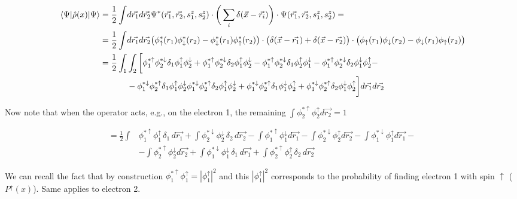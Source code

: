 	\begin{align*}
		\mel{\Psi}{\hat{\rho}(x)}{\Psi}=\frac{1}{2}\int &d\vec{r_1}d\vec{r_2} \Psi^*(\vec{r_1},\vec{r_2},s_1^z,s_2^z)\cdot\bigg(\sum_i \delta(\vec{x}-\vec{r_i})\bigg)\cdot\Psi(\vec{r_1},\vec{r_2},s_1^z,s_2^z)=\\
		=\frac{1}{2}\int &d\vec{r_1}d\vec{r_2}\big(\phi^*_\uparrow(r_1)\phi^*_\downarrow(r_2)-\phi^*_\downarrow(r_1)\phi^*_\uparrow(r_2)\big)\cdot\big(\delta(\vec{x}-\vec{r_1})+\delta(\vec{x}-\vec{r_2})\big)\cdot\big(\phi_\uparrow(r_1)\phi_\downarrow(r_2)-\phi_\downarrow(r_1)\phi_\uparrow(r_2)\big)\\
		=\frac{1}{2}\int_1&\int_2\bigg[\phi_1^{*\uparrow}\phi_2^{*\downarrow}\delta_1\phi_1^\uparrow\phi_2^\downarrow+\phi_1^{*\uparrow}\phi_2^{*\downarrow}\delta_2\phi_1^\uparrow\phi_2^\downarrow-\phi_1^{*\uparrow}\phi_2^{*\downarrow}\delta_1\phi_2^\uparrow\phi_1^\downarrow-\phi_1^{*\uparrow}\phi_2^{*\downarrow}\delta_2\phi_1^\downarrow\phi_2^\uparrow-\\
											&-\phi_1^{*\downarrow}\phi_2^{*\uparrow}\delta_1\phi_1^\uparrow\phi_2^\downarrow\phi_1^{*\downarrow}\phi_2^{*\uparrow}\delta_2\phi_1^\uparrow\phi_2^\downarrow+\phi_1^{*\downarrow}\phi_2^{*\uparrow}\delta_1\phi_1^\downarrow\phi_2^\uparrow+\phi_1^{*\downarrow}\phi_2^{*\uparrow}\delta_2\phi_1^\downarrow\phi_2^\uparrow\bigg]d\vec{r_1}d\vec{r_2}
	\end{align*}

	Now note that when the operator acts, e.g., on the electron 1, the remaining $\int \phi_2^{*\uparrow}\phi_2^\uparrow d\vec{r_2}=1$

	\begin{align*}
		=\frac{1}{2}\int&\phi_1^{*\uparrow}\phi_1^\uparrow \,\delta_1\, d\vec{r_1}+\int \phi_2^{*\downarrow}\phi_2^\downarrow\, \delta_2\, d\vec{r_2}-\int \phi_1^{*\uparrow}\phi_1^\downarrow d\vec{r_1}-\int \phi_2^{*\downarrow}\phi_2^\uparrow d\vec{r_2}-\int \phi_1^{*\downarrow}\phi_1^\uparrow d\vec{r_1}-\\
										&-\int \phi_2^{*\uparrow}\phi_2^\downarrow d\vec{r_2}+\int \phi_1^{*\downarrow}\phi_1^\downarrow\, \delta_1\, d\vec{r_1}+\int \phi_2^{*\uparrow}\phi_2^\uparrow\, \delta_2\, d\vec{r_2}
	\end{align*}

	We can recall the fact that by construction $\phi_1^{*\uparrow}\phi_1^\uparrow=|\phi_1^\uparrow|^2$  and this $|\phi_1^\uparrow|^2$ corresponds to the probability of finding electron 1 with spin $\uparrow$ ($P^\uparrow(x)$).
Same applies to electron 2.

